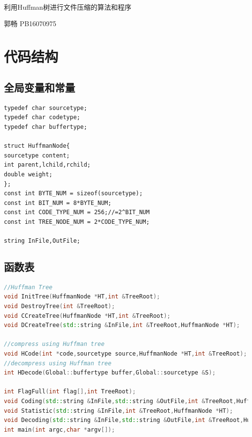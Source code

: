 \documentclass[a4paper]{ctexart}
\begin{document}
\begin{center}
\Huge 利用Huffman树进行文件压缩的算法和程序
\vspace{0.5cm}
\end{center}
\begin{center}
	\normalsize 郭畅 PB16070975
\end{center}
\section{代码结构}
\subsection{全局变量和常量}
\begin{lstlisting}
typedef char sourcetype;
typedef char codetype;
typedef char buffertype;

struct HuffmanNode{
sourcetype content;
int parent,lchild,rchild;
double weight;
};
const int BYTE_NUM = sizeof(sourcetype);
const int BIT_NUM = 8*BYTE_NUM;
const int CODE_TYPE_NUM = 256;//=2^BIT_NUM
const int TREE_NODE_NUM = 2*CODE_TYPE_NUM;

string InFile,OutFile;
\end{lstlisting}

\subsection{函数表}
\begin{lstlisting}[language=c++]
//Huffman Tree
void InitTree(HuffmanNode *HT,int &TreeRoot);
void DestroyTree(int &TreeRoot);
void CCreateTree(HuffmanNode *HT,int &TreeRoot);
void DCreateTree(std::string &InFile,int &TreeRoot,HuffmanNode *HT);

//compress using Huffman tree
void HCode(int *code,sourcetype source,HuffmanNode *HT,int &TreeRoot);
//decompress using Huffman tree
int HDecode(Global::buffertype buffer,Global::sourcetype &S);

int FlagFull(int flag[],int TreeRoot);
void Coding(std::string &InFile,std::string &OutFile,int &TreeRoot,HuffmanNode *HT);
void Statistic(std::string &InFile,int &TreeRoot,HuffmanNode *HT);
void Decoding(std::string &InFile,std::string &OutFile,int &TreeRoot,HuffmanNode *HT);
int main(int argc,char *argv[]);
\end{lstlisting}
\end{document}
